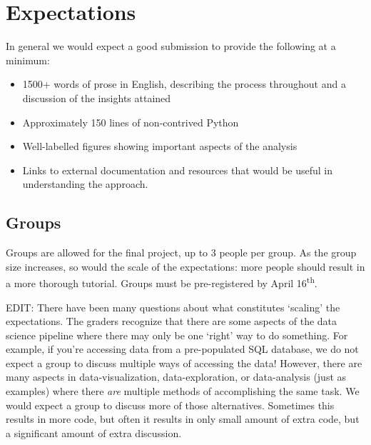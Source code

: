 \documentclass{article}
\newcommand{\redit}[1]{%
  {\color{my-magenta}#1}%
}
\begin{document}
\clearpage


\section{Expectations}

In general we would expect a good submission to provide the following at a
minimum:

\begin{itemize}
  \item 1500+ words of prose in English, describing the process throughout
        and a discussion of the insights attained
  \item Approximately 150 lines of non-contrived Python
  \item Well-labelled figures showing important aspects of the analysis
  \item Links to external documentation and resources that would be useful
        in understanding the approach.
\end{itemize}

\subsection{Groups}

Groups are allowed for the final project, up to 3 people per group. As the
group size increases, so would the scale of the expectations: more people
should result in a more thorough tutorial. Groups must be pre-registered by
April 16\textsuperscript{th}.

\redit{EDIT:} There have been many questions about what constitutes `scaling'
the expectations. The graders recognize that there are some aspects of the data
science pipeline where there may only be one `right' way to do something.  For
example, if you're accessing data from a pre-populated SQL database, we do not
expect a group to discuss multiple ways of accessing the data! However, there
are many aspects in data-visualization, data-exploration, or data-analysis
(just as examples) where there \emph{are} multiple methods of accomplishing
the same task. We would expect a group to discuss more of those alternatives.
Sometimes this results in more code, but often it results in only small amount
of extra code, but a significant amount of extra discussion.
\end{document}
